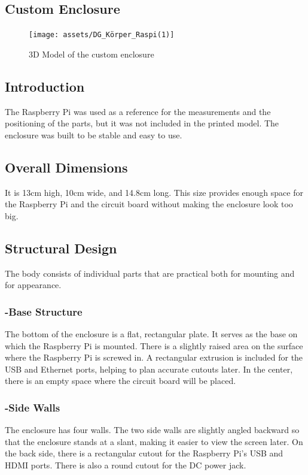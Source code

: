 \newpage

\subsection{Custom Enclosure}

\begin{figure}[h]
\centering
\texttt{[image: assets/DG\_Körper\_Raspi(1)]}
\caption{3D Model of the custom enclosure}
\label{fig:enclosure}
\end{figure}



\subsection*{Introduction}
The Raspberry Pi was used as a reference for the measurements and the positioning of the parts, but it was not included in the printed model. The enclosure was built to be stable and easy to use.

\subsection*{Overall Dimensions}
It is 13cm high, 10cm wide, and 14.8cm long. This size provides enough space for the Raspberry Pi and the circuit board without making the enclosure look too big.

\subsection*{Structural Design}
The body consists of individual parts that are practical both for mounting and for appearance.

\subsubsection*{-Base Structure}
The bottom of the enclosure is a flat, rectangular plate. It serves as the base on which the Raspberry Pi is mounted. There is a slightly raised area on the surface where the Raspberry Pi is screwed in. A rectangular extrusion is included for the USB and Ethernet ports, helping to plan accurate cutouts later. In the center, there is an empty space where the circuit board will be placed.

\subsubsection*{-Side Walls}
The enclosure has four walls. The two side walls are slightly angled backward so that the enclosure stands at a slant, making it easier to view the screen later. On the back side, there is a rectangular cutout for the Raspberry Pi’s USB and HDMI ports. There is also a round cutout for the DC power jack.

